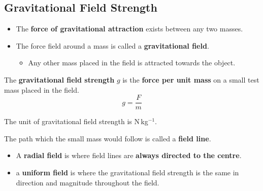\subsection{Gravitational Field Strength}

\begin{itemize}
    \item The \textbf{force of gravitational attraction} exists between any two masses.
    \item The force field around a mass is called a \textbf{gravitational field}.
        \begin{itemize}
            \item Any other mass placed in the field is attracted towards the object.
        \end{itemize}
\end{itemize}

The \textbf{gravitational field strength} $g$ is the \textbf{force per unit mass} on a small test mass placed in the field.
$$g=\frac{F}{m}$$

The unit of gravitational field strength is N\,kg$^{-1}$.

The path which the small mass would follow is called a \textbf{field line}.

\begin{itemize}
    \item A \textbf{radial field} is where field lines are \textbf{always directed to the centre}.
    \item a \textbf{uniform field} is where the gravitational field strength is the same in direction and magnitude throughout the field.
\end{itemize}
